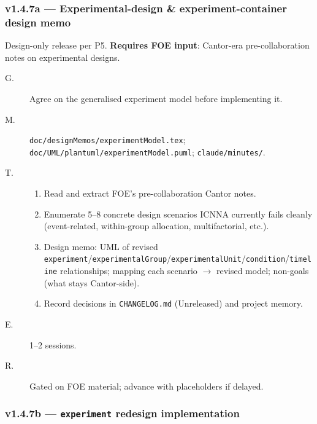 \documentclass[11pt,a4paper]{article}
\begin{document}
\subsubsection*{v1.4.7a --- Experimental-design \& experiment-container design memo}

Design-only release per P5. \textbf{Requires FOE input}: Cantor-era pre-collaboration notes on experimental designs.

\begin{description}
    \item[G.] Agree on the generalised experiment model before implementing it.
    \item[M.] \texttt{doc/designMemos/experimentModel.tex}; \texttt{doc/UML/plantuml/experimentModel.puml}; \texttt{claude/minutes/}.
    \item[T.]
        \begin{enumerate}[nosep]
            \item Read and extract FOE's pre-collaboration Cantor notes.
            \item Enumerate 5--8 concrete design scenarios ICNNA currently fails cleanly (event-related, within-group allocation, multifactorial, etc.).
            \item Design memo: UML of revised \texttt{experiment}/\texttt{experimentalGroup}/\texttt{experimentalUnit}/\texttt{condition}/\texttt{timeline} relationships; mapping each scenario $\to$ revised model; non-goals (what stays Cantor-side).
            \item Record decisions in \texttt{CHANGELOG.md} (Unreleased) and project memory.
        \end{enumerate}
    \item[E.] 1--2 sessions.
    \item[R.] Gated on FOE material; advance with placeholders if delayed.
\end{description}

\subsubsection*{v1.4.7b --- \texttt{experiment} redesign implementation}
\end{document}
